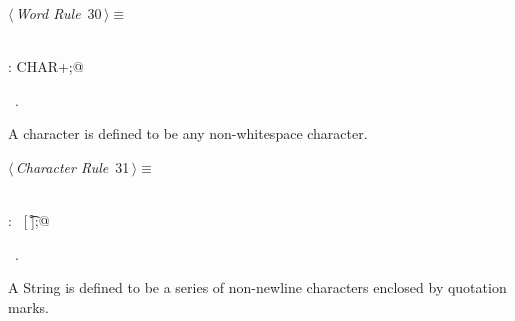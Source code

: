 \documentclass[a4paper]{report}
\begin{document}
\begin{flushleft} \small
\begin{minipage}{\linewidth}\label{scrap30}\raggedright\small
{} $\langle\,${\itshape Word Rule}\nobreak\ {\footnotesize {30}}$\,\rangle\equiv$
\vspace{-1ex}
\begin{list}{}{} \item
\mbox{}\verb@@\\
\mbox{}\verb@WORD: CHAR+;@\\
\mbox{}\verb@@{\NWsep}
\end{list}
\vspace{-1.5ex}
\footnotesize
\begin{list}{}{\setlength{\itemsep}{-\parsep}\setlength{\itemindent}{-\leftmargin}}
\item \NWtxtMacroRefIn\ .

\item{}
\end{list}
\end{minipage}\vspace{4ex}
\end{flushleft}
A character is defined to be any non-whitespace character.
\begin{flushleft} \small
\begin{minipage}{\linewidth}\label{scrap31}\raggedright\small
{} $\langle\,${\itshape Character Rule}\nobreak\ {\footnotesize {31}}$\,\rangle\equiv$
\vspace{-1ex}
\begin{list}{}{} \item
\mbox{}\verb@@\\
\mbox{}\verb@CHAR: ~[ \t\r\n];@\\
\mbox{}\verb@@{\NWsep}
\end{list}
\vspace{-1.5ex}
\footnotesize
\begin{list}{}{\setlength{\itemsep}{-\parsep}\setlength{\itemindent}{-\leftmargin}}
\item \NWtxtMacroRefIn\ .

\item{}
\end{list}
\end{minipage}\vspace{4ex}
\end{flushleft}
A String is defined to be a series of non-newline characters enclosed by quotation marks.
\end{document}
